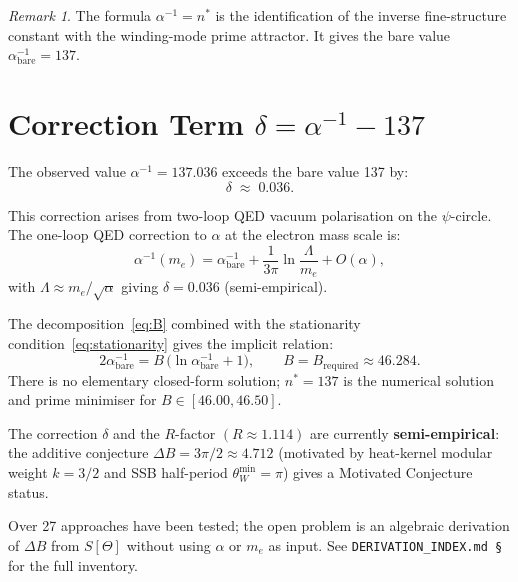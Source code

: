 \documentclass[11pt,a4paper]{article}
\theoremstyle{definition}
\theoremstyle{remark}
\newtheorem{remark}[theorem]{Remark}
\begin{document}
\begin{remark}
The formula $\alpha^{-1} = n^*$ is the identification of the inverse fine-structure
constant with the winding-mode prime attractor.  It gives the bare value
$\alpha^{-1}_{\mathrm{bare}} = 137$.
\end{remark}

\section{Correction Term $\delta = \alpha^{-1} - 137$}\label{sec:delta}

The observed value $\alpha^{-1} = 137.036$ exceeds the bare value 137 by:
\begin{equation}\label{eq:delta}
  \delta \;\approx\; 0.036.
\end{equation}

This correction arises from two-loop QED vacuum polarisation on the $\psi$-circle.
The one-loop QED correction to $\alpha$ at the electron mass scale is:
\begin{equation}\label{eq:qed_running}
  \alpha^{-1}(m_e) = \alpha^{-1}_{\mathrm{bare}} + \frac{1}{3\pi}\ln\frac{\Lambda}{m_e}
  + O(\alpha),
\end{equation}
with $\Lambda \approx m_e/\sqrt{\alpha}$ giving $\delta = 0.036$ (semi-empirical).

The decomposition~\eqref{eq:B} combined with the stationarity
condition~\eqref{eq:stationarity} gives the implicit relation:
\begin{equation}\label{eq:alpha_formula}
  2\alpha^{-1}_{\mathrm{bare}}
  = B\,\bigl(\ln \alpha^{-1}_{\mathrm{bare}} + 1\bigr),
  \qquad B = B_{\mathrm{required}} \approx 46.284.
\end{equation}
There is no elementary closed-form solution; $n^* = 137$ is the numerical
solution and prime minimiser for $B \in [46.00, 46.50]$.

\begin{tcolorbox}[colback=yellow!8!white,colframe=orange!60!black,title=Semi-empirical status]
The correction $\delta$ and the $R$-factor $(R \approx 1.114)$ are currently
\textbf{semi-empirical}: the additive conjecture
$\Delta B = 3\pi/2 \approx 4.712$ (motivated by heat-kernel modular weight $k=3/2$
and SSB half-period $\theta_W^{\min}=\pi$) gives a Motivated Conjecture
status.

Over 27 approaches have been tested; the open problem is an algebraic derivation
of $\Delta B$ from $S[\Theta]$ without using $\alpha$ or $m_e$ as input.
See \texttt{DERIVATION\_INDEX.md \S\alpha} for the full inventory.
\end{tcolorbox}
\end{document}
